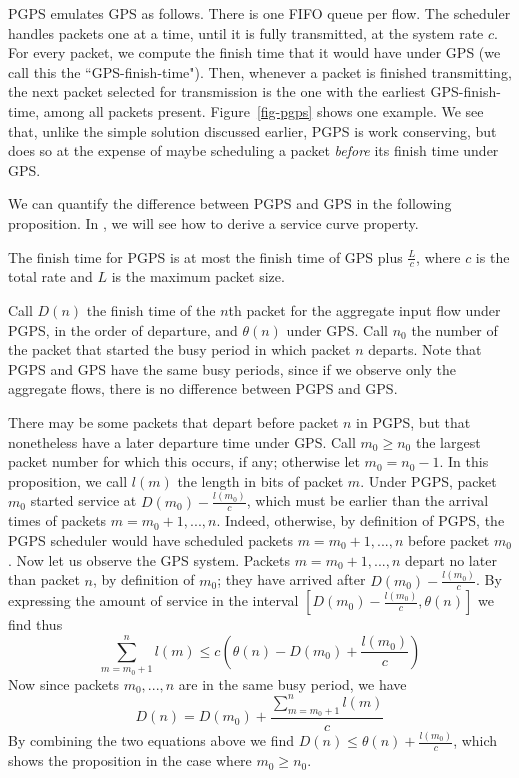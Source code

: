 PGPS emulates GPS as follows. There is one FIFO queue per flow.
The scheduler handles packets one at a time, until it is fully
transmitted, at the system rate $c$. For every packet, we compute
the finish time that it would have under GPS (we call this the
``GPS-finish-time"). Then, whenever a packet is finished
transmitting, the next packet selected for transmission is the one
with the earliest GPS-finish-time, among all packets present.
Figure~\ref{fig-pgps} shows one example. We see that, unlike the
simple solution discussed earlier, PGPS is work conserving, but
does so at the expense of maybe scheduling a packet \emph{before}
its finish time under GPS.
\begin{figure}[!htbp]
\end{figure}

We can quantify the difference between PGPS and GPS in the
following proposition. In , we will see how to derive
a service curve property.
\begin{proposition}[\cite{pg93}]
The finish time for PGPS is at most the finish time of GPS plus
$\frac{L}{c}$, where $c$ is the total rate and $L$ is the maximum
packet size.
\end{proposition}
\pr Call $D(n)$ the finish time of the $n$th packet for the
aggregate
 input flow under PGPS, in the order of departure, and $\theta(n)$ under GPS.
 Call $n_0$ the
 number of the packet that started the busy period in which packet
 $n$ departs. Note that PGPS and GPS have the same busy periods,
 since if we observe only the aggregate flows, there is no
 difference between PGPS and GPS.

 There may be some packets that
 depart before packet $n$ in PGPS, but that nonetheless have a
 later departure time under GPS.
 Call $m_0 \geq n_0$ the largest packet
 number for which this occurs, if any; otherwise let $m_0=n_0-1$.
 In this proposition, we call $l(m)$ the length in bits of packet $m$.
 Under PGPS, packet $m_0$ started service at
 $D(m_0)- \frac{l(m_0)}{c}$, which must be earlier than the
 arrival times of packets $m= m_0+1, ..., n$.
 Indeed, otherwise, by definition of PGPS, the
 PGPS scheduler would have scheduled packets $m= m_0+1, ..., n$
 before packet $m_0$. Now let us observe the GPS system. Packets $m= m_0+1, ...,
 n$ depart no later than packet $n$, by definition of $m_0$; they
 have arrived after $D(m_0)- \frac{l(m_0)}{c}$. By expressing the amount of
 service in the interval $[D(m_0)- \frac{l(m_0)}{c}, \theta(n)]$
 we find thus
 $$ \sum_{m=m_0 +1}^n l(m) \leq c \left(\theta(n) - D(m_0)+ \frac{l(m_0)}{c}\right)
 $$
Now since packets $m_0, ..., n$ are in the same busy period, we
have
 $$D(n) = D(m_0) + \frac{\sum_{m=m_0 +1}^n l(m)}{c}$$
By combining the two equations above we find $D(n) \leq \theta(n)
+ \frac{l(m_0)}{c}$, which shows the proposition in the case where
$m_0 \geq n_0$.

